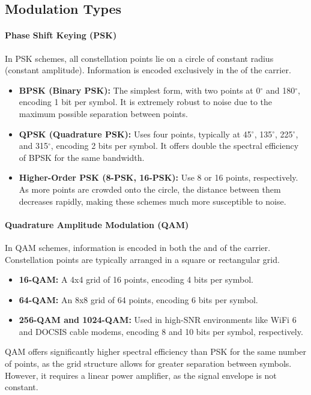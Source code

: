 \subsection{Modulation Types}

\paragraph{Phase Shift Keying (PSK)}
In PSK schemes, all constellation points lie on a circle of constant radius (constant amplitude). Information is encoded exclusively in the  of the carrier.
\begin{itemize}
    \item \textbf{BPSK (Binary PSK):} The simplest form, with two points at 0$^\circ$ and 180$^\circ$, encoding 1 bit per symbol. It is extremely robust to noise due to the maximum possible separation between points.
    \item \textbf{QPSK (Quadrature PSK):} Uses four points, typically at 45$^\circ$, 135$^\circ$, 225$^\circ$, and 315$^\circ$, encoding 2 bits per symbol. It offers double the spectral efficiency of BPSK for the same bandwidth.
    \item \textbf{Higher-Order PSK (8-PSK, 16-PSK):} Use 8 or 16 points, respectively. As more points are crowded onto the circle, the distance between them decreases rapidly, making these schemes much more susceptible to noise.
\end{itemize}

\paragraph{Quadrature Amplitude Modulation (QAM)}
In QAM schemes, information is encoded in both the  and  of the carrier. Constellation points are typically arranged in a square or rectangular grid.
\begin{itemize}
    \item \textbf{16-QAM:} A 4x4 grid of 16 points, encoding 4 bits per symbol.
    \item \textbf{64-QAM:} An 8x8 grid of 64 points, encoding 6 bits per symbol.
    \item \textbf{256-QAM and 1024-QAM:} Used in high-SNR environments like WiFi 6 and DOCSIS cable modems, encoding 8 and 10 bits per symbol, respectively.
\end{itemize}
QAM offers significantly higher spectral efficiency than PSK for the same number of points, as the grid structure allows for greater separation between symbols. However, it requires a linear power amplifier, as the signal envelope is not constant.


